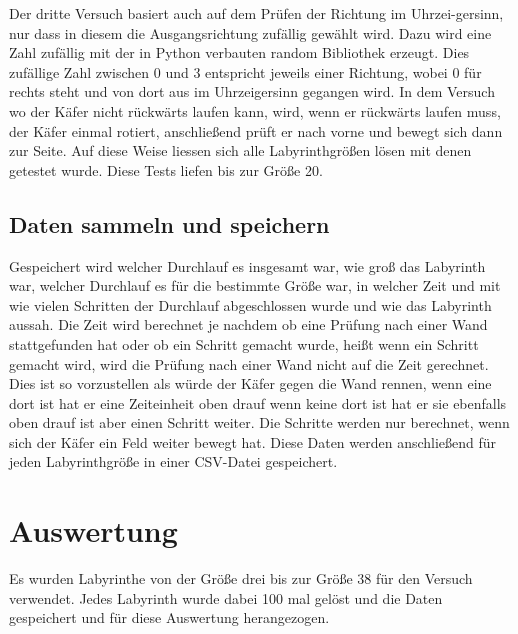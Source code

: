 \documentclass[12pt, a4paper, titlepage]{article}
\begin{document}
Der dritte Versuch basiert auch auf dem Prüfen der Richtung im Uhrzei-gersinn, nur dass in diesem die Ausgangsrichtung zufällig gewählt wird.
Dazu wird eine Zahl zufällig mit der in Python verbauten random Bibliothek erzeugt.
Dies zufällige Zahl zwischen 0 und 3 entspricht jeweils einer Richtung, wobei 0 für rechts steht und von dort aus im Uhrzeigersinn gegangen wird.
In dem Versuch wo der Käfer nicht rückwärts laufen kann, wird, wenn er rückwärts laufen muss, der Käfer einmal rotiert, anschließend prüft er nach vorne und bewegt sich dann zur Seite.
Auf diese Weise liessen sich alle Labyrinthgrößen lösen mit denen getestet wurde.
Diese Tests liefen bis zur Größe 20.

\subsection{Daten sammeln und speichern}

Gespeichert wird welcher Durchlauf es insgesamt war, wie groß das Labyrinth war, welcher Durchlauf es für die bestimmte Größe war, in welcher Zeit und mit wie vielen Schritten der Durchlauf abgeschlossen wurde und wie das Labyrinth aussah.
Die Zeit wird berechnet je nachdem ob eine Prüfung nach einer Wand stattgefunden hat oder ob ein Schritt gemacht wurde, heißt wenn ein Schritt gemacht wird, wird die Prüfung nach einer Wand nicht auf die Zeit gerechnet.
Dies ist so vorzustellen als würde der Käfer gegen die Wand rennen, wenn eine dort ist hat er eine Zeiteinheit oben drauf wenn keine dort ist hat er sie ebenfalls oben drauf ist aber einen Schritt weiter.
Die Schritte werden nur berechnet, wenn sich der Käfer ein Feld weiter bewegt hat.
Diese Daten werden anschließend für jeden Labyrinthgröße in einer CSV-Datei gespeichert.

\section{Auswertung}

Es wurden Labyrinthe von der Größe drei bis zur Größe 38 für den Versuch verwendet.
Jedes Labyrinth wurde dabei 100 mal gelöst und die Daten gespeichert und für diese Auswertung herangezogen.

\bigskip
\end{document}

